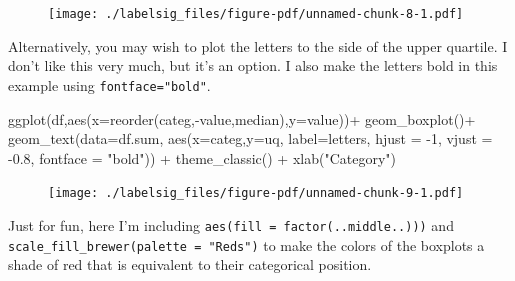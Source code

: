 \documentclass[
  letterpaper,
  DIV=11,
  numbers=noendperiod]{scrreprt}
\newenvironment{Shaded}{\begin{snugshade}}{\end{snugshade}}
\newcommand{\AttributeTok}[1]{\textcolor[rgb]{0.40,0.45,0.13}{#1}}
\newcommand{\DecValTok}[1]{\textcolor[rgb]{0.68,0.00,0.00}{#1}}
\newcommand{\FloatTok}[1]{\textcolor[rgb]{0.68,0.00,0.00}{#1}}
\newcommand{\FunctionTok}[1]{\textcolor[rgb]{0.28,0.35,0.67}{#1}}
\newcommand{\NormalTok}[1]{\textcolor[rgb]{0.00,0.23,0.31}{#1}}
\newcommand{\SpecialCharTok}[1]{\textcolor[rgb]{0.37,0.37,0.37}{#1}}
\newcommand{\StringTok}[1]{\textcolor[rgb]{0.13,0.47,0.30}{#1}}
\begin{document}
\begin{figure}[H]

{\centering \texttt{[image: ./labelsig\_files/figure-pdf/unnamed-chunk-8-1.pdf]}

}

\end{figure}

Alternatively, you may wish to plot the letters to the side of the upper
quartile. I don't like this very much, but it's an option. I also make
the letters bold in this example using \texttt{fontface="bold"}.

\begin{Shaded}
\begin{Highlighting}[]
\FunctionTok{ggplot}\NormalTok{(df,}\FunctionTok{aes}\NormalTok{(}\AttributeTok{x=}\FunctionTok{reorder}\NormalTok{(categ,}\SpecialCharTok{{-}}\NormalTok{value,median),}\AttributeTok{y=}\NormalTok{value))}\SpecialCharTok{+}
  \FunctionTok{geom\_boxplot}\NormalTok{()}\SpecialCharTok{+}
  \FunctionTok{geom\_text}\NormalTok{(}\AttributeTok{data=}\NormalTok{df.sum,}
            \FunctionTok{aes}\NormalTok{(}\AttributeTok{x=}\NormalTok{categ,}\AttributeTok{y=}\NormalTok{uq,}
                \AttributeTok{label=}\NormalTok{letters,}
                \AttributeTok{hjust =} \SpecialCharTok{{-}}\DecValTok{1}\NormalTok{, }
                \AttributeTok{vjust =} \SpecialCharTok{{-}}\FloatTok{0.8}\NormalTok{, }
                \AttributeTok{fontface =} \StringTok{"bold"}\NormalTok{)) }\SpecialCharTok{+}
  \FunctionTok{theme\_classic}\NormalTok{() }\SpecialCharTok{+}
  \FunctionTok{xlab}\NormalTok{(}\StringTok{"Category"}\NormalTok{)}
\end{Highlighting}
\end{Shaded}

\begin{figure}[H]

{\centering \texttt{[image: ./labelsig\_files/figure-pdf/unnamed-chunk-9-1.pdf]}

}

\end{figure}

Just for fun, here I'm including
\texttt{aes(fill\ =\ factor(..middle..)))} and
\texttt{scale\_fill\_brewer(palette\ =\ "Reds")} to make the colors of
the boxplots a shade of red that is equivalent to their categorical
position.
\end{document}
